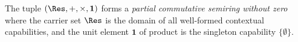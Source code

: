 \begin{definition}\label{def:contextual-capabilities-algebra}
  The tuple $(\Res,{+},{\times},\mathbf{1})$ forms a \emph{partial
    commutative semiring without zero} where the carrier set $\Res$ is
  the domain of all well-formed contextual capabilities, and the unit
  element $\mathbf{1}$ of product is the singleton capability
  $\{\emptyset\}$. 




\end{definition}
